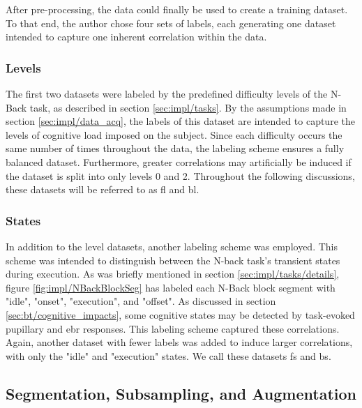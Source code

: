 After pre-processing, the data could finally be used to create a training dataset. To that end, the author chose four sets of labels, each generating one dataset intended to capture one inherent correlation within the data.

\subsubsection{Levels}

The first two datasets were labeled by the predefined difficulty levels of the N-Back task, as described in section \ref{sec:impl/tasks}. By the assumptions made in section \ref{sec:impl/data_acq}, the labels of this dataset are intended to capture the levels of cognitive load imposed on the subject. Since each difficulty occurs the same number of times throughout the data, the labeling scheme ensures a fully balanced dataset. Furthermore, greater correlations may artificially be induced if the dataset is split into only levels 0 and 2. Throughout the following discussions, these datasets will be referred to as \acrfull{fl} and \acrfull{bl}.

\subsubsection{States}

In addition to the level datasets, another labeling scheme was employed. This scheme was intended to distinguish between the N-back task's transient states during execution. 
As was briefly mentioned in section \ref{sec:impl/tasks/details}, figure \ref{fig:impl/NBackBlockSeg} has labeled each N-Back block segment with "idle", "onset", "execution", and "offset". 
As discussed in section \ref{sec:bt/cognitive_impacts}, some cognitive states may be detected by task-evoked pupillary and \acrshort{ebr} responses. This labeling scheme captured these correlations. Again, another dataset with fewer labels was added to induce larger correlations, with only the "idle" and "execution" states. We call these datasets \acrfull{fs} and \acrfull{bs}.

\subsection{Segmentation, Subsampling, and Augmentation}

